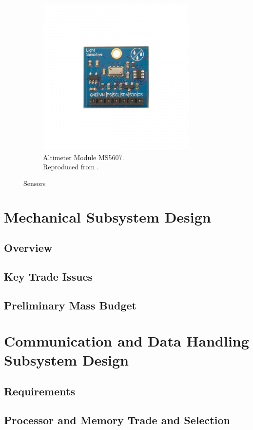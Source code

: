 \documentclass[10pt]{article}
\begin{document}
\begin{figure}[H]
\begin{subfigure}{0.5\textwidth}
\centering
\includegraphics[scale =0.3]{1.png}
\caption{Altimeter Module MS5607. \\Reproduced from \citep{par}.}
\label{fig:pres}
\end{subfigure}
\caption{Sensors}
\end{figure}


\newpage

\section{Mechanical Subsystem Design}
\subsection{Overview}
\subsection{Key Trade Issues}
\subsection{Preliminary Mass Budget}

\newpage

\section{Communication and Data Handling Subsystem Design}
\subsection{Requirements}
\subsection{Processor and Memory Trade and Selection}
\end{document}
